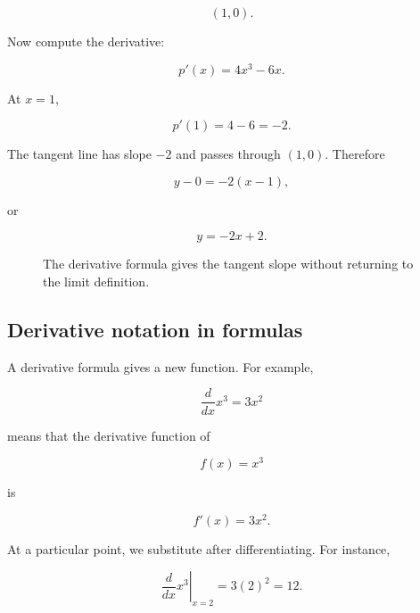 \[
(1,0).
\]

Now compute the derivative:

\[
p'(x)=4x^3-6x.
\]

At \(x=1\),

\[
p'(1)=4-6=-2.
\]

The tangent line has slope \(-2\) and passes through \((1,0)\).  Therefore

\[
y-0=-2(x-1),
\]

or

\[
\boxed{
y=-2x+2.
}
\]

\begin{figure}[h]
\centering
{}
\caption{The derivative formula gives the tangent slope without returning to the limit definition.}
\label{fig:polynomial-tangent-first-formulas}
\end{figure}

\subsection{Derivative notation in formulas}
\label{subsec:derivative-notation-formulas}

A derivative formula gives a new function.  For example,

\[
\frac{d}{dx}x^3=3x^2
\]

means that the derivative function of

\[
f(x)=x^3
\]

is

\[
f'(x)=3x^2.
\]

At a particular point, we substitute after differentiating.  For instance,

\[
\left.\frac{d}{dx}x^3\right|_{x=2}
=
3(2)^2
=
12.
\]

